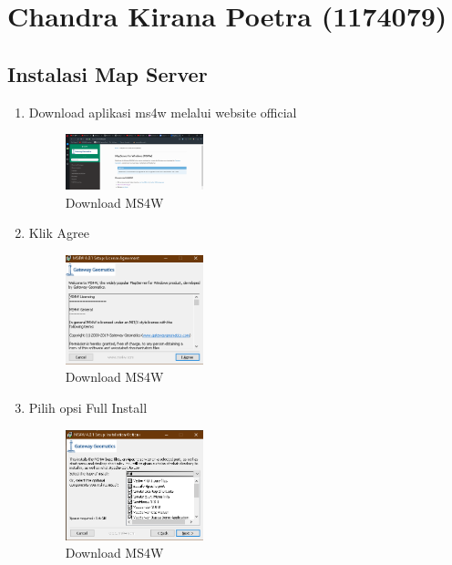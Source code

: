 \section{Chandra Kirana Poetra (1174079)}
\subsection{Instalasi Map Server}
\begin{enumerate}
    \item Download aplikasi ms4w melalui website official
    \hfill\break
    \begin{figure}[H]
		\includegraphics[width=4cm]{figures/tugas4/1174079/1_download_MS4.png}
		\centering
		\caption{Download MS4W}
    \end{figure}
    \hfill\break

    \item Klik Agree
    \hfill\break
    \begin{figure}[H]
		\includegraphics[width=4cm]{figures/tugas4/1174079/2_MS4_Agree.png}
		\centering
		\caption{Download MS4W}
    \end{figure}
    \hfill\break
    \item Pilih opsi Full Install
    \hfill\break
    \begin{figure}[H]
		\includegraphics[width=4cm]{figures/tugas4/1174079/3_Full_Install.png}
		\centering
		\caption{Download MS4W}
    \end{figure}
    \hfill\break

\end{enumerate}


